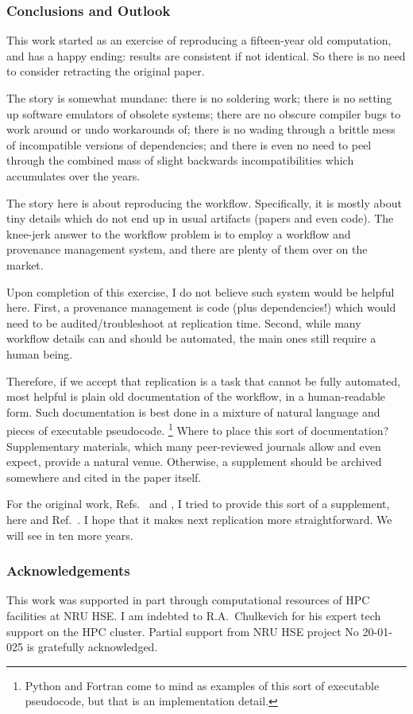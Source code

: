 \subsubsection{Conclusions and Outlook}

This work started as an exercise of reproducing a fifteen-year old computation,
and has a happy ending: results are consistent if not identical. So there is no
need to consider retracting the original paper.

The story is somewhat mundane: there is no soldering work; there is no
setting up software emulators of obsolete systems; 
there are no obscure compiler bugs to work around or undo workarounds of;
there is no wading through a brittle mess of incompatible versions of dependencies;
and there is even no need to peel through the combined mass of 
slight backwards incompatibilities which accumulates over the years.

The story here is about reproducing the workflow. Specifically, it is mostly
about tiny details which do not end up in usual artifacts (papers and even code).
The knee-jerk answer to the workflow problem is to employ a workflow and
provenance management system, and there are plenty of them over on the market.

Upon completion of this exercise, I do not believe such system would be helpful
here. First, a provenance management is code (plus dependencies!) which would need to
be audited/troubleshoot at replication time.
Second, while many workflow details can and should be automated, the main ones
still require a human being. 

Therefore, if we accept that replication is a task that cannot be fully automated,
most helpful is plain old documentation of the workflow, in a human-readable form.
Such documentation is best done in a mixture of natural language and pieces of
executable pseudocode.
%
\footnote{Python and Fortran come to mind as examples of this sort of
executable pseudocode, but that is an implementation detail.}
%
Where to place this sort of documentation? Supplementary materials, which
many peer-reviewed journals allow and even expect, provide a natural venue.
Otherwise, a supplement should be archived somewhere and cited in the paper itself.

For the original work, Refs.\ \cite{PRL:2006} and \cite{NJP:2006}, I tried to
provide this sort of a supplement, here and Ref.\ \cite{GH:2020}. I hope that it makes
next replication more straightforward. We will see in ten more years.


\subsubsection{Acknowledgements} This work was supported in part through
computational resources of HPC facilities at NRU HSE. I am indebted to
R.A.~Chulkevich for his expert tech support on the HPC cluster.
Partial support from NRU HSE project No 20-01-025 is gratefully acknowledged.




